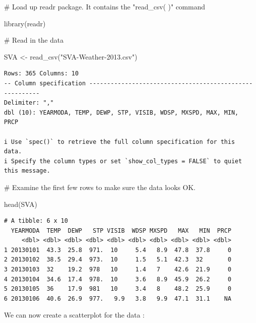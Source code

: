 \documentclass[
  letterpaper,
  DIV=11,
  numbers=noendperiod]{scrreprt}
\newenvironment{Shaded}{\begin{snugshade}}{\end{snugshade}}
\newcommand{\CommentTok}[1]{\textcolor[rgb]{0.37,0.37,0.37}{#1}}
\newcommand{\FunctionTok}[1]{\textcolor[rgb]{0.28,0.35,0.67}{#1}}
\newcommand{\NormalTok}[1]{\textcolor[rgb]{0.00,0.23,0.31}{#1}}
\newcommand{\OtherTok}[1]{\textcolor[rgb]{0.00,0.23,0.31}{#1}}
\newcommand{\StringTok}[1]{\textcolor[rgb]{0.13,0.47,0.30}{#1}}
\begin{document}
\begin{Shaded}
\begin{Highlighting}[]
\CommentTok{\# Load up readr package. It contains the "read\_csv( )" command}

\FunctionTok{library}\NormalTok{(readr)}
\end{Highlighting}
\end{Shaded}

\begin{Shaded}
\begin{Highlighting}[]
\CommentTok{\# Read in the data}

\NormalTok{SVA }\OtherTok{\textless{}{-}} \FunctionTok{read\_csv}\NormalTok{(}\StringTok{"SVA{-}Weather{-}2013.csv"}\NormalTok{)}
\end{Highlighting}
\end{Shaded}

\begin{verbatim}
Rows: 365 Columns: 10
-- Column specification --------------------------------------------------------
Delimiter: ","
dbl (10): YEARMODA, TEMP, DEWP, STP, VISIB, WDSP, MXSPD, MAX, MIN, PRCP

i Use `spec()` to retrieve the full column specification for this data.
i Specify the column types or set `show_col_types = FALSE` to quiet this message.
\end{verbatim}

\begin{Shaded}
\begin{Highlighting}[]
\CommentTok{\# Examine the first few rows to make sure the data looks OK.}

\FunctionTok{head}\NormalTok{(SVA)}
\end{Highlighting}
\end{Shaded}

\begin{verbatim}
# A tibble: 6 x 10
  YEARMODA  TEMP  DEWP   STP VISIB  WDSP MXSPD   MAX   MIN  PRCP
     <dbl> <dbl> <dbl> <dbl> <dbl> <dbl> <dbl> <dbl> <dbl> <dbl>
1 20130101  43.3  25.8  971.  10     5.4   8.9  47.8  37.8     0
2 20130102  38.5  29.4  973.  10     1.5   5.1  42.3  32       0
3 20130103  32    19.2  978   10     1.4   7    42.6  21.9     0
4 20130104  34.6  17.4  978.  10     3.6   8.9  45.9  26.2     0
5 20130105  36    17.9  981   10     3.4   8    48.2  25.9     0
6 20130106  40.6  26.9  977.   9.9   3.8   9.9  47.1  31.1    NA
\end{verbatim}

We can now create a scatterplot for the data :
\end{document}
